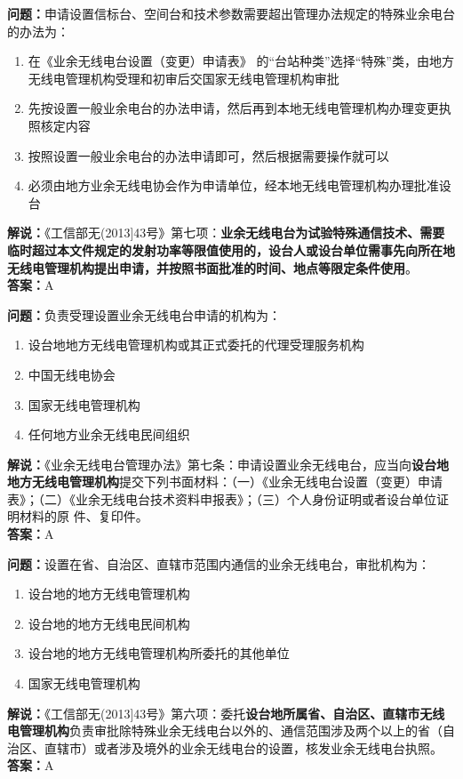 \textbf{问题：}申请设置信标台、空间台和技术参数需要超出管理办法规定的特殊业余电台的办法为：
\begin{enumerate}[label=\Alph*), leftmargin=1cm]
	\item 在《业余无线电台设置（变更）申请表》 的“台站种类”选择“特殊”类，由地方无线电管理机构受理和初审后交国家无线电管理机构审批
	\item 先按设置一般业余电台的办法申请，然后再到本地无线电管理机构办理变更执照核定内容
	\item 按照设置一般业余电台的办法申请即可，然后根据需要操作就可以
	\item 必须由地方业余无线电协会作为申请单位，经本地无线电管理机构办理批准设台
\end{enumerate}
\textbf{解说：}《工信部无(2013]43号》第七项：\textbf{业余无线电台为试验特殊通信技术、需要临时超过本文件规定的发射功率等限值使用的，设台人或设台单位需事先向所在地无线电管理机构提出申请，并按照书面批准的时间、地点等限定条件使用}。\\\textbf{答案：}A

\textbf{问题：}负责受理设置业余无线电台申请的机构为：
\begin{enumerate}[label=\Alph*), leftmargin=1cm]
	\item 设台地地方无线电管理机构或其正式委托的代理受理服务机构
	\item 中国无线电协会
	\item 国家无线电管理机构
	\item 任何地方业余无线电民间组织
\end{enumerate}
\textbf{解说：}《业余无线电台管理办法》第七条：申请设置业余无线电台，应当向\textbf{设台地地方无线电管理机构}提交下列书面材料：（一）《业余无线电台设置（变更）申请表》；（二）《业余无线电台技术资料申报表》；（三）个人身份证明或者设台单位证明材料的原
件、复印件。\\\textbf{答案：}A

\textbf{问题：}设置在省、自治区、直辖市范围内通信的业余无线电台，审批机构为：
\begin{enumerate}[label=\Alph*), leftmargin=1cm]
	\item 设台地的地方无线电管理机构
	\item 设台地的地方无线电民间机构
	\item 设台地的地方无线电管理机构所委托的其他单位
	\item 国家无线电管理机构
\end{enumerate}
\textbf{解说：}《工信部无(2013]43号》第六项：委托\textbf{设台地所属省、自治区、直辖市无线电管理机构}负责审批除特殊业余无线电台以外的、通信范围涉及两个以上的省（自治区、直辖市）或者涉及境外的业余无线电台的设置，核发业余无线电台执照。\\\textbf{答案：}A

